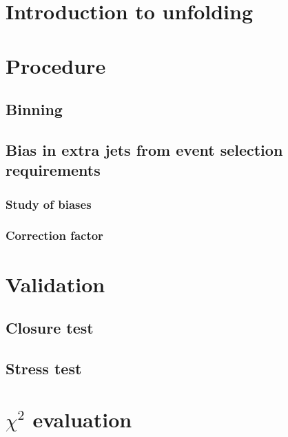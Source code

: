 \section{Introduction to unfolding}
\section{Procedure}
\subsection{Binning}
\subsection{Bias in extra jets from event selection requirements}
\subsubsection{Study of biases}
\subsubsection{Correction factor}
\section{Validation}
\subsection{Closure test}
\subsection{Stress test}
\section{$\chi^2$ evaluation}
